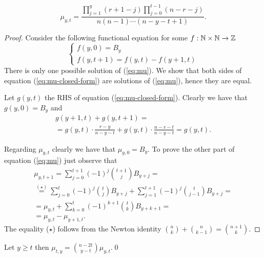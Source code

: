 \documentclass[a4paper,twoside,justified]{tufte-handout}
\begin{document}
\begin{lemma}

\begin{equation}\label{eq:mu-closed-form}
\mu_{y,t}=\frac{\prod_{j=1}^y (r+1-j)\prod_{j=0}^{t-1} (n-r-j)}{n (n-1)\cdots (n-y-t +1)}.
\end{equation}

\end{lemma}
\begin{proof}

Consider the following functional equation for some $f:\mathbb{N}\times \mathbb{N} \rightarrow \mathbb{Z}$ 
\begin{equation}\label{eq:mu}
\begin{cases}
f(y,0)=B_y\\
f(y,t+1)=f(y,t)-f(y+1,t)
\end{cases}
\end{equation}
 There is only one possible solution of (\ref{eq:mu}). We show that both sides of equation (\ref{eq:mu-closed-form}) are solutions of (\ref{eq:mu}), hence they are equal.
 
Let $g(y,t)$ the RHS of equation (\ref{eq:mu-closed-form}). Clearly we have that $g(y,0)=B_y$ and 
\begin{equation*}
\begin{split}
g(y+1,t)+g(y,t+1)
=\\
=
g(y,t)\cdot \frac{r-y}{n-y-t}+ g(y,t)\cdot \frac{n-r-t}{n-y-t}=g(y,t).
\end{split}
\end{equation*}


Regarding $\mu_{y,t}$ clearly we have that $\mu_{y,0}=B_y$. To prove the other part of equation (\ref{eq:mu}) just observe that
\begin{equation*}
\begin{split}
\mu_{y,t+1}=\sum_{j=0}^{t+1} (-1)^j{t+1 \choose j}B_{y+j}
=\\
\stackrel{(\star)}{=}
\sum_{j=0}^{t} (-1)^j{t \choose j}B_{y+j}+\sum_{j=1}^{t+1} (-1)^j{t \choose j-1}B_{y+j}
=\\
=
\mu_{y,t}+\sum_{k=0}^{t} (-1)^{k+1}{t \choose k}B_{y+k+1}
=\\
=
\mu_{y,t}-\mu_{y+1,t}.
\end{split}
\end{equation*}
The equality ($\star$) follows from the Newton identity ${n \choose k}+{n\choose k-1}={n+1 \choose k}$.
\end{proof}

\begin{lemma} \label{lem:yt-ty}
Let $y\geq t$ then $\mu_{t,y}={n-2t \choose y-t} \mu_{y,t}$.\qed
\end{lemma}
\end{document}
